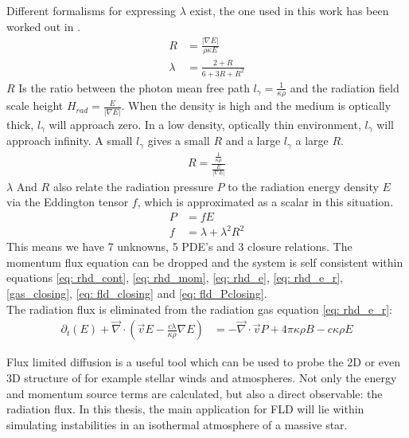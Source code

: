 Different formalisms for expressing $\lambda$ exist, the one used in this work has been worked out in \cite{Levermore1981}. 
\begin{align}
R &= \frac{|\nabla E|}{\rho \kappa E} \\
\lambda &= \frac{2 + R}{6 + 3R + R^2} 
\end{align}
$R$ Is the ratio between the photon mean free path $l_\gamma = \frac{1}{\kappa \rho}$ and the radiation field scale height $H_{rad} = \frac{E}{\left| \nabla E \right|}$. When the density is high and the medium is optically thick, $l_\gamma$ will approach zero. In a low density, optically thin environment, $l_\gamma$ will approach infinity. A small $l_\gamma$ gives a small $R$ and a large $l_\gamma$ a large $R$.
\begin{align*}
R = \frac{\frac{1}{\kappa \rho}}{\frac{E}{\left| \nabla E \right|}}
\end{align*}
$\lambda$ And $R$ also relate the radiation pressure $P$ to the radiation energy density $E$ via the Eddington tensor $f$, which is approximated as a scalar in this situation.
\begin{align}
P &= f E  \label{eq: fld_Pclosing} \\
f &= \lambda + \lambda^2 R^2
\end{align}
This means we have 7 unknowns, 5 PDE's and 3 closure relations. The momentum flux equation can be dropped and the system is self consistent within equations \eqref{eq: rhd_cont}, \eqref{eq: rhd_mom}, \eqref{eq: rhd_e}, \eqref{eq: rhd_e_r}, \eqref{gas_closing}, \eqref{eq: fld_closing} and \eqref{eq: fld_Pclosing}. \\
The radiation flux is eliminated from the radiation gas equation \ref{eq: rhd_e_r}:
\begin{align}
 \partial_t \left(E \right) +  \vec{\nabla} \cdot \left( \vec{v} E -\frac{c \lambda}{\kappa \rho} \nabla E \right) &=  -\vec{\nabla} \cdot \vec{v} P + 4\pi \kappa\rho B - c \kappa \rho E
\end{align}

Flux limited diffusion is a useful tool which can be used to probe the 2D or even 3D structure of for example stellar winds and atmospheres. Not only the energy and momentum source terms are calculated, but also a direct observable: the radiation flux. In this thesis, the main application for FLD will lie within simulating instabilities in an isothermal atmosphere of a massive star.